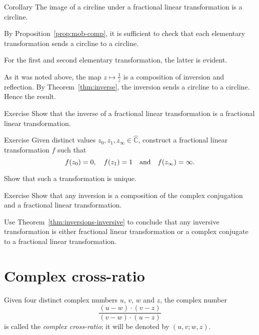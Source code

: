 \begin{thm}{Corollary}\label{cor:cline-Moeb}
The image of a circline under a fractional linear transformation 
is a circline.
\end{thm}

By Proposition~\ref{prop:mob-comp},
it is sufficient to check that each elementary transformation sends a circline to a circline.

For the first and second elementary transformation, the latter is evident.

As it was noted above,
the map $z\mapsto\tfrac1z$ is a composition of inversion and reflection.
By Theorem~\ref{thm:inverse}, the inversion sends a circline to a circline.
Hence the result.
\qeds

\begin{thm}{Exercise}\label{ex:inverse-Mob}
Show that the inverse of a fractional linear transformation is a fractional linear transformation.
\end{thm}


\begin{thm}{Exercise}\label{ex:3-point-Mob}
Given distinct values $z_0,z_1,z_\infty\in \hat{\mathbb{C}}$,
construct a fractional linear transformation $f$ such that 
\[f(z_0)=0,
\quad 
f(z_1)=1
\quad\text{and}\quad 
f(z_\infty)\z=\infty.\]

Show that such a transformation is unique.
\end{thm}

\begin{thm}{Exercise}\label{ex:inversion-Mob}
Show that any inversion is a composition of the complex conjugation and a fractional linear transformation.

Use Theorem~\ref{thm:inversions-inversive} to conclude that any inversive transformation is either fractional linear transformation or a complex conjugate to a fractional linear transformation.
\end{thm}



\section*{Complex cross-ratio}

Given four distinct complex numbers $u$, $v$, $w$ and $z$,
the complex number
$$
\frac{(u-w)\cdot(v-z)}{(v-w)\cdot(u-z)}$$
is called the \emph{complex cross-ratio}; 
it will be denoted by $(u,v;w,z)$.

